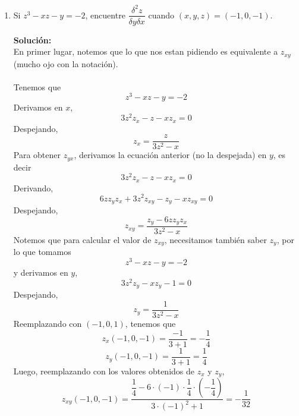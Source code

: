 \documentclass[12pt]{article}
\newenvironment{solucion}
{\begin{mdframed}[backgroundcolor=black!10]
		{\bf Solución:}\\
	}
	{
	\end{mdframed}
}
\newenvironment{preguntas}
{\begin{enumerate}\itemsep12pt
	}
	{
	\end{enumerate}
}
\begin{document}
\begin{preguntas}
\item Si $z^3 - xz - y = -2$, encuentre $\dfrac{\delta^2z}{\delta y \delta x}$ cuando $(x,y,z) = (-1, 0, -1)$.
\begin{solucion}
En primer lugar, notemos que lo que nos estan pidiendo es equivalente a $z_{xy}$ (mucho ojo con la notación).\\
\\
Tenemos que
$$z^3 -xz -y = -2$$
Derivamos en $x$,
$$3z^2z_x - z - xz_x = 0$$
Despejando,
$$z_x = \dfrac{z}{3z^2 - x}$$
Para obtener $z_{yx}$, derivamos la ecuación anterior (no la despejada) en $y$, es decir
$$3z^2z_x - z - xz_x = 0$$
Derivando,
$$6zz_yz_x + 3z^2z_{xy} - z_y - xz_{xy} = 0$$
Despejando,
$$z_{xy} = \dfrac{z_y - 6zz_yz_x}{3z^2 -x}$$
Notemos que para calcular el valor de $z_{xy}$, necesitamos también saber $z_y$, por lo que tomamos
$$z^3 -xz -y = -2$$
y derivamos en $y$,
$$3z^2z_y - xz_y - 1 = 0$$
Despejando,
$$z_y = \dfrac{1}{3z^2 - x}$$
Reemplazando con $(-1,0,1)$, tenemos que
$$z_x(-1,0,-1) = \dfrac{-1}{3+1} = -\dfrac{1}{4}$$
$$z_y(-1,0,-1) = \dfrac{1}{3+1} = \dfrac{1}{4}$$
Luego, reemplazando con los valores obtenidos de $z_x$ y $z_y$,
$$z_{xy}(-1,0,-1) = \dfrac{\dfrac{1}{4} - 6 \cdot (-1)\cdot \dfrac{1}{4} \cdot \left(-\dfrac{1}{4}\right)}{3\cdot (-1)^2 + 1} = -\dfrac{1}{32}$$



\end{solucion}
\end{preguntas}
\end{document}
